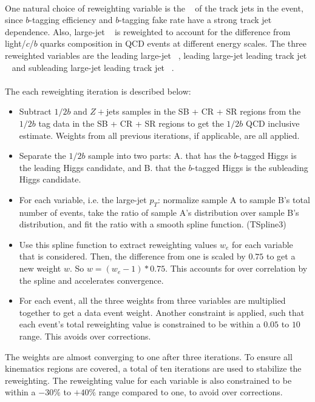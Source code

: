 \paragraph{}
One natural choice of reweighting variable is the \pt~ of the track jets in the event, since $b$-tagging efficiency and $b$-tagging fake rate have a strong track jet \pt~ dependence. 
Also, large-\R jet \pt~ is reweighted to account for the difference from light/$c$/$b$ quarks composition in QCD events at different energy scales.
The three reweighted variables are the leading large-\R jet \pt~, leading large-\R jet leading track jet \pt~ and subleading large-\R jet leading track jet \pt~.

\paragraph{}
The each reweighting iteration is described below:
\begin{itemize}
\item Subtract $1/2b$ \ttbar and $Z+$jets samples in the SB + CR + SR regions from the $1/2b$ tag data in the SB + CR + SR regions to get the $1/2b$ QCD inclusive estimate. Weights from all previous iterations, if applicable, are all applied.
\item Separate the $1/2b$ sample into two parts: A. that has the $b$-tagged Higgs is the leading \pt Higgs candidate, and B. that the $b$-tagged Higgs is the subleading \pt Higgs candidate.
\item For each variable, i.e. the large-\R jet $p_{T}$: normalize sample A to sample B's total number of events, take the ratio of sample A's distribution over sample B's distribution, and fit the ratio with a smooth spline function. (TSpline3)
\item Use this spline function to extract reweighting values $w_{e}$ for each variable that is considered. Then, the difference from one is scaled by $0.75$ to get a new weight $w$. So $w = (w_{e} - 1) * 0.75$. This accounts for over correlation by the spline and accelerates convergence.
\item For each event, all the three weights from three variables are multiplied together to get a data event weight. Another constraint is applied, such that each event's total reweighting value is constrained to be within a $0.05$ to $10$ range. This avoids over corrections.
\end{itemize}
The weights are almost converging to one after three iterations.
To ensure all kinematics regions are covered, a total of ten iterations are used to stabilize the reweighting. 
The reweighting value for each variable is also constrained to be within a $-30\%$ to $+40\%$ range compared to one, to avoid over corrections.

